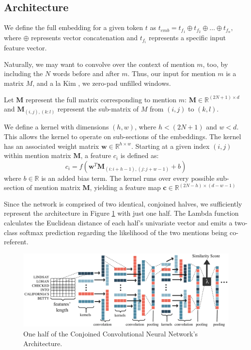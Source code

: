 \subsection{Architecture}
We define the full embedding for a given token $t$ as $t_{emb} = t_{f_{1}} \oplus t_{f_{2}} \oplus \ldots \oplus t_{f_{n}},$ where $\oplus$ represents vector concatenation and $t_{f_{i}}$ represents a specific input feature vector.

Naturally, we may want to convolve over the context of mention $m$, too, by including the $N$ words before and after $m$.  Thus, our input for mention $m$ is a matrix $M$, and a la Kim \cite{DBLP:conf/emnlp/Kim14}, we zero-pad unfilled windows.

\vspace{3mm}

Let $\textbf{M}$ represent the full matrix corresponding to mention $m$: $\textbf{M} \in \mathbb{R}^{(2N+1) \times d}$ and $\textbf{M}_{(i,j),(k:l)}$ represent the sub-matrix of $M$ from $(i,j)$ to $(k,l)$.

\vspace{3mm}

We define a kernel with dimensions $(h,w)$, where $h < (2N+1)$ and $w < d$.  This allows the kernel to operate on sub-sections of the embeddings.  The kernel has an associated weight matrix $\textbf{w} \in \mathbb{R}^{h \times w}$.  Starting at a given index $(i,j)$ within mention matrix $\textbf{M}$, a feature $c_{i}$ is defined as:
\begin{equation}
c_{i} = f(\textbf{w}^{T}\textbf{M}_{(i:i+h-1),(j:j+w-1)} + b)
\end{equation}
where $b \in \mathbb{R}$ is an added bias term.  The kernel runs over every possible sub-section of mention matrix $\textbf{M}$, yielding a feature map $\textbf{c} \in \mathbb{R}^{(2N-h) \times (d-w-1)}$

\vspace{3mm}

Since the network is comprised of two identical, conjoined halves, we sufficiently represent the architecture in Figure \ref{fig:ccnn} with just one half.  The Lambda function calculates the Euclidean distance of each half's univariate vector and emits a two-class softmax prediction regarding the likelihood of the two mentions being co-referent.

\begin{figure}[h]
\centering
	\includegraphics[width=1\textwidth]{graphics/architecture.pdf}
	\caption{One half of the Conjoined Convolutional Neural Network's Architecture.}
	\label{fig:ccnn}
\end{figure}

